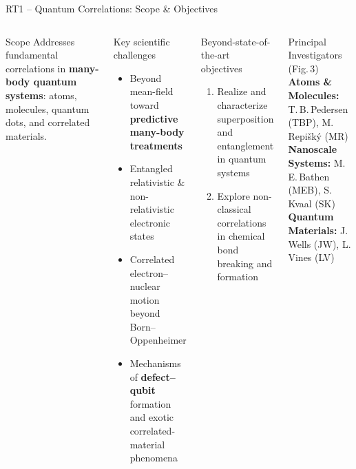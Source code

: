 \documentclass[aspectratio=169,10pt]{beamer}
\begin{document}
\begin{frame}{RT1 -- Quantum Correlations: Scope \& Objectives}
  \begin{columns}[T]
      \begin{block}{Scope}
        Addresses fundamental correlations in
        \textbf{many-body quantum systems}: atoms, molecules,
        quantum dots, and correlated materials.
      \end{block}
      \vspace{2pt}
      \begin{block}{Key scientific challenges}
        \begin{itemize}
          \item Beyond mean-field toward \textbf{predictive many-body treatments}
          \item Entangled relativistic \& non-relativistic electronic states
          \item Correlated electron--nuclear motion beyond Born--Oppenheimer
          \item Mechanisms of \textbf{defect--qubit} formation and exotic
                correlated-material phenomena
        \end{itemize}
      \end{block}
      \begin{alertblock}{Beyond-state-of-the-art objectives}
        \begin{enumerate}
          \item Realize and characterize superposition and
                entanglement in quantum systems
          \item Explore non-classical correlations in chemical
                bond breaking and formation
        \end{enumerate}
      \end{alertblock}
      \vspace{2pt}
      \begin{block}{Principal Investigators (Fig.\,3)}
        \textbf{Atoms \& Molecules:}
          T.\,B.\,Pedersen (TBP), M.\,Repi\v{s}k\'{y} (MR)\\[2pt]
        \textbf{Nanoscale Systems:}
          M.\,E.\,Bathen (MEB), S.\,Kvaal (SK)\\[2pt]
        \textbf{Quantum Materials:}
          J.\,Wells (JW), L.\,Vines (LV)
      \end{block}
  \end{columns}
\end{frame}
\end{document}
